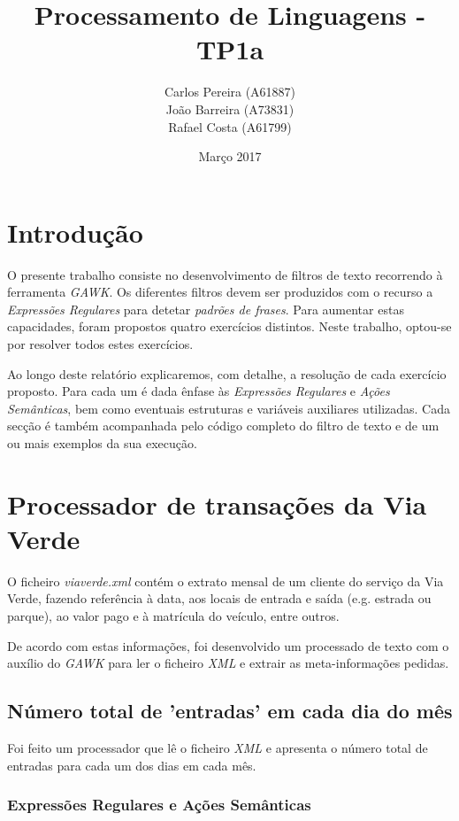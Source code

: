\documentclass{article}
\title{\textbf{Processamento de Linguagens - TP1a}}
\author{\begin{tabular}{c}
            \textbf{} Carlos Pereira (A61887) \\ João Barreira (A73831) \\ Rafael Costa (A61799)
        \end{tabular}
       }
\date{Março 2017}
\begin{document}
\maketitle

\newpage
\renewcommand*\contentsname{Índice}

\tableofcontents

\newpage
\section{Introdução}

O presente trabalho consiste no desenvolvimento de filtros de texto recorrendo à ferramenta \emph{GAWK}. Os diferentes filtros devem ser produzidos com o recurso a \emph{Expressões Regulares} para detetar \emph{padrões de frases}. Para aumentar estas capacidades, foram propostos quatro exercícios distintos. Neste trabalho, optou-se por resolver todos estes exercícios.

Ao longo deste relatório explicaremos, com detalhe, a resolução de cada exercício proposto. Para cada um é dada ênfase às \emph{Expressões Regulares} e \emph{Ações Semânticas}, bem como eventuais estruturas e variáveis auxiliares utilizadas. Cada secção é também acompanhada pelo código completo do filtro de texto e de um ou mais exemplos da sua execução.

\newpage
\section{Processador de transações da Via Verde}

O ficheiro \emph{viaverde.xml} contém o extrato mensal de um cliente do serviço da Via Verde, fazendo referência à data, aos locais de entrada e saída (e.g. estrada ou parque), ao valor pago e à matrícula do veículo, entre outros.

De acordo com estas informações, foi desenvolvido um processado de texto com o auxílio do \emph{GAWK} para ler o ficheiro \emph{XML} e extrair as meta-informações pedidas.

\subsection{Número total de 'entradas' em cada dia do mês}

Foi feito um processador que lê o ficheiro \emph{XML} e apresenta o número total de entradas para cada um dos dias em cada mês.

\subsubsection{Expressões Regulares e Ações Semânticas}
\end{document}
